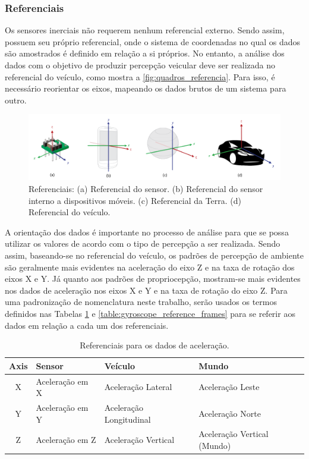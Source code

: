 \subsubsection{Referenciais}

Os sensores inerciais não requerem nenhum referencial externo. Sendo assim, possuem seu próprio referencial, onde o sistema de coordenadas no qual os dados são amostrados é definido em relação a si próprios. No entanto, a análise dos dados com o objetivo de produzir percepção veicular deve ser realizada no referencial do veículo, como mostra a \autoref{fig:quadros_referencia}. Para isso, é necessário reorientar os eixos, mapeando os dados brutos de um sistema para outro.

\begin{figure}[h]
  \centering
  \caption{Referenciais: (a) Referencial do sensor. (b) Referencial do sensor interno a dispositivos móveis. (c) Referencial da Terra. (d) Referencial do veículo.}
   \label{fig:quadros_referencia}
   \includegraphics[width=1\textwidth]{figuras/fig_3.png}
\end{figure}

A orientação dos dados é importante no processo de análise para que se possa utilizar os valores de acordo com o tipo de percepção a ser realizada. Sendo assim, baseando-se no referencial do veículo, os padrões de percepção de ambiente são geralmente mais evidentes na aceleração do eixo Z e na taxa de rotação dos eixos X e Y. Já quanto aos padrões de propriocepção, mostram-se mais evidentes nos dados de aceleração nos eixos X e Y e na taxa de rotação do eixo Z. Para uma padronização de nomenclatura neste trabalho, serão usados os termos definidos nas Tabelas \ref{table:accelerometer_reference_frames} e \ref{table:gyroscope_reference_frames} para se referir aos dados em relação a cada um dos referenciais.

\begin{table}[h]
    \caption{Referenciais para os dados de aceleração.}
    \label{table:accelerometer_reference_frames}
    \centering
    \small
    \begin{tabular}{clll}
        \toprule
        \textbf{Axis} & \textbf{Sensor} & \textbf{Veículo} & \textbf{Mundo} \\
        \toprule
        X & Aceleração em X & Aceleração Lateral & Aceleração Leste \\
        \midrule
        Y & Aceleração em Y & Aceleração Longitudinal & Aceleração Norte \\
        \midrule
        Z & Aceleração em Z & Aceleração Vertical & Aceleração Vertical (Mundo) \\
        \bottomrule
    \end{tabular}
\end{table}

